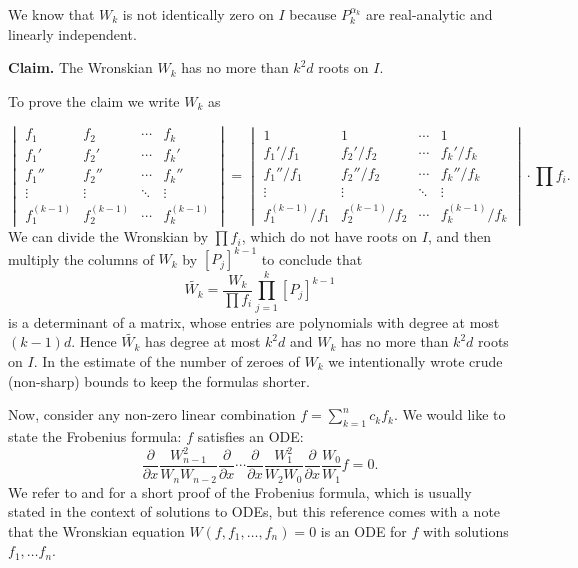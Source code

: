 \documentclass{article}
\begin{document}
We know that $W_k$ is not identically zero on $I$ because $P_k^{\alpha_k}$ are real-analytic and linearly independent.

\textbf{Claim.} The Wronskian $W_k$ has no more than $k^2d$ roots on $I$.

To prove the claim we write 
$W_k$ as

\begin{equation}
 \begin{vmatrix}
f_1 & f_2 & \cdots & f_k \\
f_1' & f_2' & \cdots & f_k' \\
f_1'' & f_2'' & \cdots & f_k'' \\
\vdots & \vdots & \ddots & \vdots \\
f_1^{(k-1)} & f_2^{(k-1)} & \cdots & f_k^{(k-1)}
\end{vmatrix} =  \begin{vmatrix}
1 & 1 & \cdots & 1 \\
f_1'/f_1 & f_2'/f_2 & \cdots & f_k'/f_k \\
f_1''/f_1 & f_2''/f_2 & \cdots & f_k''/f_k \\
\vdots & \vdots & \ddots & \vdots \\
f_1^{(k-1)}/f_1 & f_2^{(k-1)}/f_2 & \cdots & f_k^{(k-1)}/f_k
\end{vmatrix} \cdot \prod f_i. 
\end{equation}
We can divide the Wronskian by $\prod f_i$, which do not have roots on $I$, and then multiply the columns of $W_k$ by $[P_j]^{k-1}$ to conclude that $$\tilde{W_k}= \frac{W_k}{\prod f_i} \prod_{j=1}^{k} [P_j]^{k-1} $$ is a determinant of a matrix, whose entries are polynomials with degree at most $(k-1)d$. Hence $\tilde{W_k}$ has degree at most $k^2d$ and $W_k$ has no more than $k^2d$ roots on $I$. In the estimate of the number of zeroes of $W_k$ we intentionally wrote crude (non-sharp) bounds to keep the formulas shorter.

Now, consider any non-zero linear combination $f=\sum_{k=1}^{n} c_k f_k$.
We would like to state the Frobenius formula: \(f \) satisfies an ODE:
\begin{equation}
\frac{\partial}{\partial x}\frac{W_{n-1}^2}{W_n W_{n-2}}\frac{\partial}{\partial x} \cdots \frac{\partial}{\partial x}  \frac{W_{1}^2}{W_2 W_{0}}  \frac{\partial}{\partial x} \frac{W_{0}}{W_{1}}  f = 0.
\end{equation}
We refer to \cite{Ke} and \cite{NY} for a short proof of the Frobenius formula, which is usually stated in the context of solutions to ODEs, but this reference comes with a note that the Wronskian equation $W(f,f_1,\dots,f_n)=0$ is an ODE for $f$ with solutions $f_1,\dots f_n$.
\end{document}
